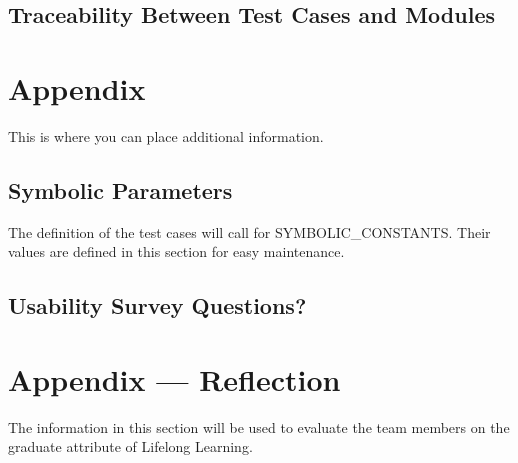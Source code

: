 \documentclass[12pt, titlepage]{article}
\begin{document}
\subsection{Traceability Between Test Cases and Modules}






\newpage

\section{Appendix}

This is where you can place additional information.

\subsection{Symbolic Parameters}

The definition of the test cases will call for SYMBOLIC\_CONSTANTS.
Their values are defined in this section for easy maintenance.

\subsection{Usability Survey Questions?}


\newpage{}
\section*{Appendix --- Reflection}


The information in this section will be used to evaluate the team members on the
graduate attribute of Lifelong Learning.


\end{document}
